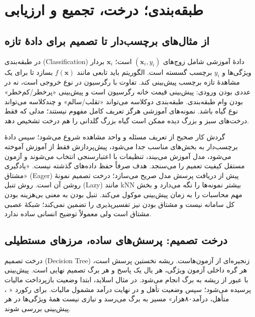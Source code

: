 \chapter{طبقه‌بندی؛ درخت، تجمیع و ارزیابی}
\section{از مثال‌های برچسب‌دار تا تصمیم برای دادهٔ تازه}

در طبقه‌بندی (Classification) دادهٔ آموزشی شامل زوج‌های $(\mathbf x_i,y_i)$ است؛ $\mathbf x_i$ بردار ویژگی‌ها و $y_i$ برچسب گسسته است. الگوریتم باید تابعی مانند $f(\mathbf x)$ بسازد تا برای یک مشاهدهٔ تازه برچسب پیش‌بینی کند. تفاوت با رگرسیون در نوع خروجی است، نه در عددی بودن ورودی: پیش‌بینی قیمت خانه رگرسیون است و پیش‌بینی «پرخطر/کم‌خطر» بودن وام طبقه‌بندی. طبقه‌بندی دوکلاسه می‌تواند «تقلب/سالم» و چندکلاسه می‌تواند نوع گیاه باشد. نمونه‌های آموزشی هرگز تعریف کامل مفهوم نیستند؛ مدلی که فقط درخت‌های سبز و بزرگ دیده ممکن است گیاه بزرگ گلدانی را هم درخت تشخیص دهد.

گردش کار صحیح از تعریف مسئله و واحد مشاهده شروع می‌شود؛ سپس دادهٔ برچسب‌دار به بخش‌های مناسب جدا می‌شود، پیش‌پردازش فقط از آموزش آموخته می‌شود، مدل آموزش می‌بیند، تنظیمات با اعتبارسنجی انتخاب می‌شوند و آزمون مستقل کیفیت تعمیم را می‌سنجد. هدف صرفاً حفظ داده‌های گذشته نیست. «یادگیری مشتاق» (Eager) پیش از دریافت پرسش مدل صریح می‌سازد؛ درخت تصمیم نمونهٔ روشن آن است. روش تنبل (Lazy) مانند kNN بیشتر نمونه‌ها را نگه می‌دارد و بخش مهم محاسبات را به زمان پیش‌بینی موکول می‌کند. تنبل بودن به معنی بی‌هزینه بودن کل سامانه نیست و مشتاق بودن نیز تفسیرپذیری را تضمین نمی‌کند؛ شبکهٔ عصبی مشتاق است ولی معمولاً توضیح انسانی ساده ندارد.



\section{درخت تصمیم: پرسش‌های ساده، مرزهای مستطیلی}

درخت تصمیم (Decision Tree) زنجیره‌ای از آزمون‌هاست. ریشه نخستین پرسش است، هر گره داخلی آزمون ویژگی، هر یال یک پاسخ و هر برگ تصمیم نهایی است. پیش‌بینی با عبور از ریشه به برگ انجام می‌شود. در مثال اسلاید، ابتدا وضعیت بازپرداخت مالیات پرسیده می‌شود؛ سپس وضعیت تأهل و در نهایت درآمد مشمول مالیات. برای رکورد « ، متأهل، درآمد۸۰هزار» مسیر به برگ  می‌رسد و نیازی نیست همهٔ ویژگی‌ها در هر پیش‌بینی بررسی شوند.

